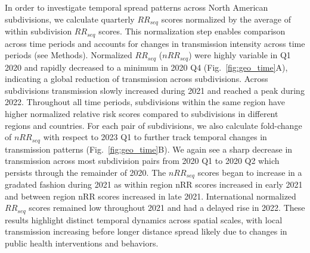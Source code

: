 \documentclass[11pt, letterpaper, oneside]{article}
\begin{document}
In order to investigate temporal spread patterns across North American subdivisions, we calculate quarterly $RR_{seq}$ scores normalized by the average of within subdivision $RR_{seq}$ scores.
This normalization step enables comparison across time periods and accounts for changes in transmission intensity across time periods (see Methods).
Normalized $RR_{seq}$ ($nRR_{seq}$) were highly variable in Q1 2020 and rapidly decreased to a minimum in 2020 Q4 (Fig.\ \ref{fig:geo_time}A), indicating a global reduction of transmission across subdivisions.
Across subdivisions transmission slowly increased during 2021 and reached a peak during 2022.
Throughout all time periods, subdivisions within the same region have higher normalized relative risk scores compared to subdivisions in different regions and countries.
For each pair of subdivisions, we also calculate fold-change of $nRR_{seq}$ with respect to 2023 Q1 to further track temporal changes in transmission patterns (Fig.\ \ref{fig:geo_time}B).
We again see a sharp decrease in transmission across most subdivision pairs from 2020 Q1 to 2020 Q2 which persists through the remainder of 2020.
The $nRR_{seq}$ scores began to increase in a gradated fashion during 2021 as within region nRR scores increased in early 2021 and between region nRR scores increased in late 2021.
International normalized $RR_{seq}$ scores remained low throughout 2021 and had a delayed rise in 2022.
These results highlight distinct temporal dynamics across spatial scales, with local transmission increasing before longer distance spread likely due to changes in public health interventions and behaviors.
\end{document}
